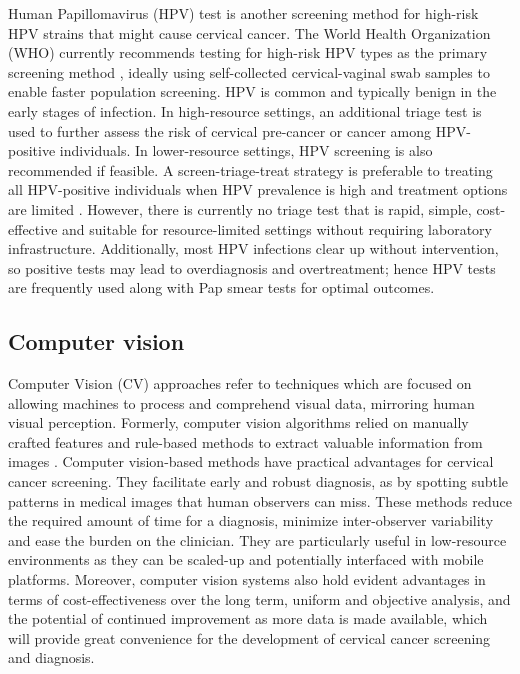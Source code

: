 \documentclass{svjour3}
\begin{document}
Human Papillomavirus (HPV) test is another screening method for high-risk HPV strains that might cause cervical cancer. The World Health Organization (WHO) currently recommends testing for high-risk HPV types as the primary screening method \cite{ref9}, ideally using self-collected cervical-vaginal swab samples to enable faster population screening. HPV is common and typically benign in the early stages of infection. In high-resource settings, an additional triage test is used to further assess the risk of cervical pre-cancer or cancer among HPV-positive individuals. In lower-resource settings, HPV screening is also recommended if feasible. A screen-triage-treat strategy is preferable to treating all HPV-positive individuals when HPV prevalence is high and treatment options are limited \cite{ref10}. However, there is currently no triage test that is rapid, simple, cost-effective and suitable for resource-limited settings without requiring laboratory infrastructure. Additionally, most HPV infections clear up without intervention, so positive tests may lead to overdiagnosis and overtreatment; hence HPV tests are frequently used along with Pap smear tests for optimal outcomes.
\subsection{Computer vision}
Computer Vision (CV) approaches refer to techniques which are focused on allowing machines to process and comprehend visual data, mirroring human visual perception. Formerly, computer vision algorithms relied on manually crafted features and rule-based methods to extract valuable information from images \cite{ref11}. Computer vision-based methods have practical advantages for cervical cancer screening. They facilitate early and robust diagnosis, as by spotting subtle patterns in medical images that human observers can miss. These methods reduce the required amount of time for a diagnosis, minimize inter-observer variability and ease the burden on the clinician. They are particularly useful in low-resource environments as they can be scaled-up and potentially interfaced with mobile platforms. Moreover, computer vision systems also hold evident advantages in terms of cost-effectiveness over the long term, uniform and objective analysis, and the potential of continued improvement as more data is made available, which will provide great convenience for the development of cervical cancer screening and diagnosis.
\end{document}
